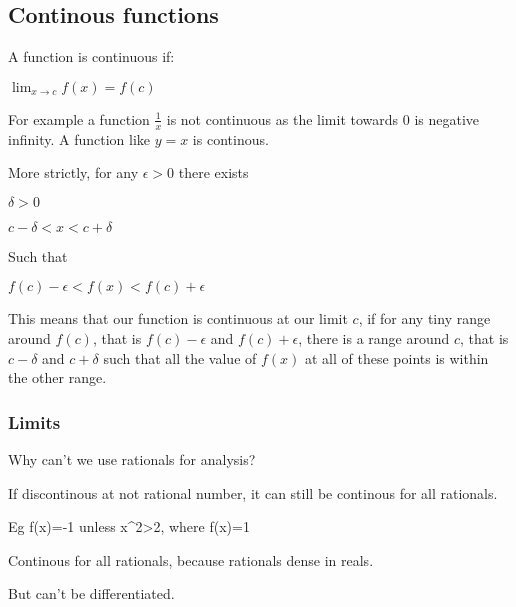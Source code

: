 
\subsection{Continous functions}

A function is continuous if:

$\lim_{x\rightarrow c} f(x)=f(c)$

For example a function \(\frac{1}{x}\) is not continuous as the limit towards \(0\) is negative infinity. A function like \(y=x\) is continous.

More strictly, for any \(\epsilon >0\) there exists

$\delta >0 $

$c-\delta < x< c +\delta $

Such that

$f(c)-\epsilon < f(x) < f(c)+\epsilon $

This means that our function is continuous at our limit \(c\), if for any tiny range around \(f(c)\), that is \(f(c)-\epsilon\) and \(f(c)+\epsilon\), there is a range around \(c\), that is \(c-\delta \) and \(c+ \delta \) such that all the value of \(f(x)\) at all of these points is within the other range.

\subsubsection{Limits}

Why can't we use rationals for analysis?

If discontinous at not rational number, it can still be continous for all rationals.

Eg f(x)=-1 unless x^2>2, where f(x)=1

Continous for all rationals, because rationals dense in reals.

But can't be differentiated.

